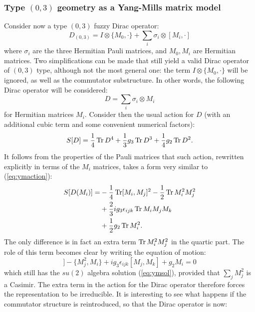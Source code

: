 \subsubsection{Type $(0,3)$ geometry as a Yang-Mills matrix model}
Consider now a type $(0,3)$ fuzzy Dirac operator:
\begin{equation}
D_{(0,3)} = I \otimes \{M_0,\cdot \} + \sum_i \sigma_i \otimes [M_i,\cdot ]
\end{equation}
where $\sigma_i$ are the three Hermitian Pauli matrices, and $M_0, M_i$ are Hermitian matrices. Two simplifications can be made that still yield a valid Dirac operator of $(0,3)$ type, although not the most general one: the term ${I \otimes \{M_0,\cdot \}}$ will be ignored, as well as the commutator substructure. In other words, the following Dirac operator will be considered:
\begin{equation}
D = \sum_i \sigma_i \otimes M_i
\end{equation}
for Hermitian matrices $M_i$.\newline
Consider then the usual action for $D$ (with an additional cubic term and some convenient numerical factors):
\begin{equation}
S[D] = \frac{1}{4} \operatorname{Tr} D^4 + \frac{1}{3}g_3 \operatorname{Tr} D^3 + \frac{1}{4}g_2 \operatorname{Tr} D^2.
\end{equation}
It follows from the properties of the Pauli matrices that such action, rewritten explicitly in terms of the $M_i$ matrices, takes a form very similar to (\ref{eq:ymaction}):
\begin{align}
S[D(M_i)] = &-\frac{1}{4} \operatorname{Tr} [M_i, M_j]^2 -\frac{1}{2} \operatorname{Tr} M_i^2 M_j^2 \\ \notag
&+ \frac{2}{3} i g_3 \epsilon_{ijk} \operatorname{Tr} M_i M_j M_k \\ \notag
&+ \frac{1}{2} g_2 \operatorname{Tr} M_i^2.
\end{align}
The only difference is in fact an extra term $\operatorname{Tr} M_i^2 M_j^2$ in the quartic part. The role of this term becomes clear by writing the equation of motion:
\begin{equation}
[M_j, [M_j, M_i]] - \{M_j^2, M_i \} + i g_3 \epsilon_{ijk}[M_j, M_k] + g_2 M_i = 0
\end{equation}
which still has the $su(2)$ algebra solution (\ref{eq:ymsol}), provided that $\sum_j M_j^2$ is a Casimir. The extra term in the action for the Dirac operator therefore forces the representation to be irreducible.\newline
It is interesting to see what happens if the commutator structure is reintroduced, so that the Dirac operator is now:
